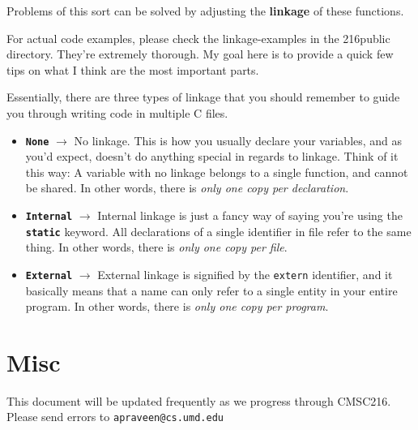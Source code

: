 \documentclass[english, 10pt]{article}
\begin{document}
Problems of this sort can be solved by adjusting the \textbf{linkage} of these functions.\newline

For actual code examples, please check the linkage-examples in the 216public directory. They're extremely thorough. My goal here is to provide a quick few tips on what I think are the most important parts.\newline

Essentially, there are three types of linkage that you should remember to guide you through writing code in multiple C files.

\begin{itemize}
	\item \textbf{\texttt{None}} $\rightarrow$ No linkage. This is how you usually declare your variables, and as you'd expect, doesn't do anything special in regards to linkage. Think of it this way: A variable with no linkage belongs to a single function, and cannot be shared. In other words, there is \textit{only one copy per declaration}.
	\item \textbf{\texttt{Internal}} $\rightarrow$ Internal linkage is just a fancy way of saying you're using the \textbf{\texttt{static}} keyword. All declarations of a single identifier in file refer to the same thing. In other words, there is \textit{only one copy per file}.
	\item \textbf{\texttt{External}} $\rightarrow$ External linkage is signified by the \texttt{extern} identifier, and it basically means that a name can only refer to a single entity in your entire program. In other words, there is \textit{only one copy per program}.
	
\end{itemize}



\section{Misc}

This document will be updated frequently as we progress through CMSC216. Please send errors to \texttt{apraveen@cs.umd.edu}
\end{document}
